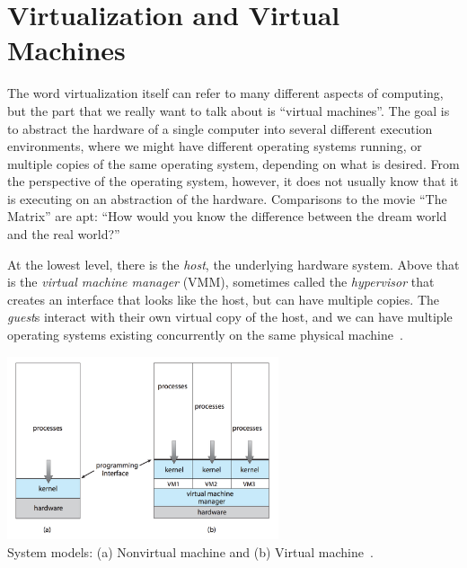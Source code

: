 




\section*{Virtualization and Virtual Machines}

The word virtualization itself can refer to many different aspects of computing, but the part that we really want to talk about is ``virtual machines''. The goal is to abstract the hardware of a single computer into several different execution environments, where we might have different operating systems running, or multiple copies of the same operating system, depending on what is desired. From the perspective of the operating system, however, it does not usually know that it is executing on an abstraction of the hardware. Comparisons to the movie ``The Matrix'' are apt: ``How would you know the difference between the dream world and the real world?''

At the lowest level, there is the \textit{host}, the underlying hardware system. Above that is the \textit{virtual machine manager} (VMM), sometimes called the \textit{hypervisor} that creates an interface that looks like the host, but can have multiple copies. The \textit{guest}s interact with their own virtual copy of the host, and we can have multiple operating systems existing concurrently on the same physical machine~\cite{osc}. 

\begin{center}
	\includegraphics[width=0.6\textwidth]{images/non-virtual-machine.png}\\
	System models: (a) Nonvirtual machine and (b) Virtual machine~\cite{osc}.
\end{center}

